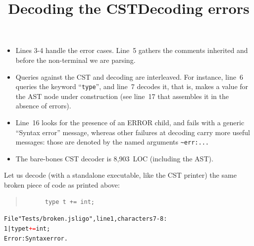 \documentclass[wide]{slides}
\begin{document}
\begin{slide}
  \title{Decoding the CST}

  \begin{itemize}

    \item Lines 3-4 handle the error cases. Line~5 gathers the
      comments inherited and before the non\hyp{}terminal we are
      parsing.

    \item Queries against the CST and decoding are interleaved. For
      instance, line~6 queries the keyword ``\texttt{type}'', and
      line~7 decodes it, that is, makes a value for the AST node under
      construction (see line~17 that assembles it in the absence of
      errors).

    \item Line~16 looks for the presence of an ERROR child, and fails
      with a generic ``Syntax error'' message, whereas other failures
      at decoding carry more useful messages: those are denoted by the
      named arguments \texttt{\~{}err:...}

    \item The bare\hyp{}bones CST decoder is 8,903~LOC (including the
      AST).

  \end{itemize}

\end{slide}

\begin{slide}
  \title{Decoding errors}

  Let us decode (with a standalone executable, like the CST printer)
  the same broken piece of code as printed above:
  \begin{quote}
    \begin{lstlisting}
      type t += int;
    \end{lstlisting}
  \end{quote}

  \begin{alltt}
    \small
File "Tests/broken.jsligo", line 1, characters 7-8:
  1 | type t \textcolor{red}{+=} int;
Error: Syntax error.
  \end{alltt}

\end{slide}
\end{document}
